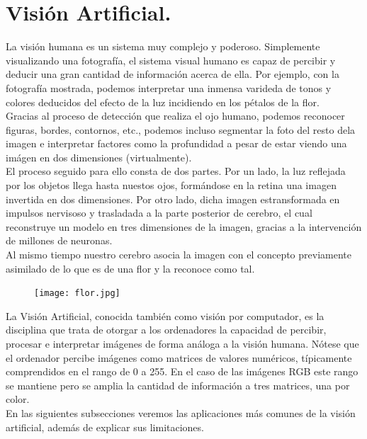 \documentclass[a4paper,10pt]{article}
\begin{document}
\section{Visión Artificial.}
La visión humana es un sistema muy complejo y poderoso. Simplemente
visualizando una fotografía, el sistema visual humano es capaz
de percibir y deducir una gran cantidad de información acerca de ella. Por ejemplo, con la fotografía mostrada, podemos interpretar una inmensa varideda de tonos y colores deducidos del efecto de la luz incidiendo en los pétalos de la flor.
\\Gracias al proceso de detección que realiza el ojo humano, podemos reconocer figuras, bordes, contornos, etc., podemos incluso segmentar la foto del resto dela imagen e interpretar factores como la profundidad a pesar de estar viendo una imágen en dos dimensiones (virtualmente).\\
El proceso seguido para ello consta de dos partes. Por un lado, la luz reflejada por los objetos llega hasta nuestos ojos, formándose en la retina una imagen invertida en dos
dimensiones.  Por otro lado, dicha imagen estransformada en impulsos nervisoso y trasladada a la parte posterior de cerebro, 
el cual reconstruye un modelo en tres dimensiones de la imagen, gracias a la intervención de millones de neuronas. 
\\Al mismo tiempo nuestro cerebro asocia la imagen con el concepto previamente asimilado de lo que es de una flor y la reconoce como tal.
\begin{figure}[H]
\centering
\texttt{[image: flor.jpg]}
\end{figure}
\noindent
La Visión Artificial, conocida también como visión por computador, es la disciplina que trata de otorgar a los ordenadores la capacidad de percibir, procesar  e interpretar imágenes de forma análoga a la visión humana. Nótese que el ordenador percibe imágenes como matrices de valores numéricos, típicamente comprendidos en el rango de 0 a 255. En el caso de las imágenes RGB este rango se mantiene pero se amplia la cantidad de información a tres matrices, una por color.\\
En las siguientes subsecciones veremos las aplicaciones más comunes de la visión artificial, además de explicar sus limitaciones.
\end{document}
